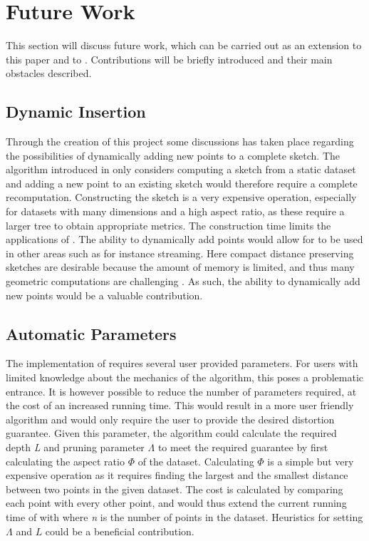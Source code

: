 \section{Future Work}
\label{futurework}
This section will discuss future work, which can be carried out as an extension to this paper and to \cite{wagner17}. Contributions will be briefly introduced and their main obstacles described. 

\subsection{Dynamic Insertion}
Through the creation of this project some discussions has taken place regarding the possibilities of dynamically adding new points to a complete sketch. The algorithm introduced in \cite{wagner17} only considers computing a sketch from a static dataset and adding a new point to an existing sketch would therefore require a complete recomputation. Constructing the sketch is a very expensive operation, especially for datasets with many dimensions and a high aspect ratio, as these require a larger tree to obtain appropriate metrics. The construction time limits the applications of \qs{}. The ability to dynamically add points would allow for \qs{} to be used in other areas such as for instance streaming. Here compact distance preserving sketches are desirable because the amount of memory is limited, and thus many geometric computations are  challenging \cite{ShanM}. As such, the ability to dynamically add new points would be a valuable contribution. 

\subsection{Automatic Parameters}
The implementation of \qs{} requires several user provided parameters. For users with limited knowledge about the mechanics of the algorithm, this poses a problematic entrance. It is however possible to reduce the number of parameters required, at the cost of an increased running time. This would result in a more user friendly algorithm and would only require the user to provide the desired distortion guarantee. Given this parameter, the algorithm could calculate the required depth \textit{L} and pruning parameter $\Lambda$ to meet the required guarantee by first calculating the aspect ratio $\Phi$ of the dataset. Calculating $\Phi$ is a simple but very expensive operation as it requires finding the largest and the smallest distance between two points in the given dataset. The cost is calculated by comparing each point with every other point, and would thus extend the current running time of \qs{} with  where \textit{n} is the number of points in the dataset. Heuristics for setting $\Lambda$ and $L$ could be a beneficial contribution. 


